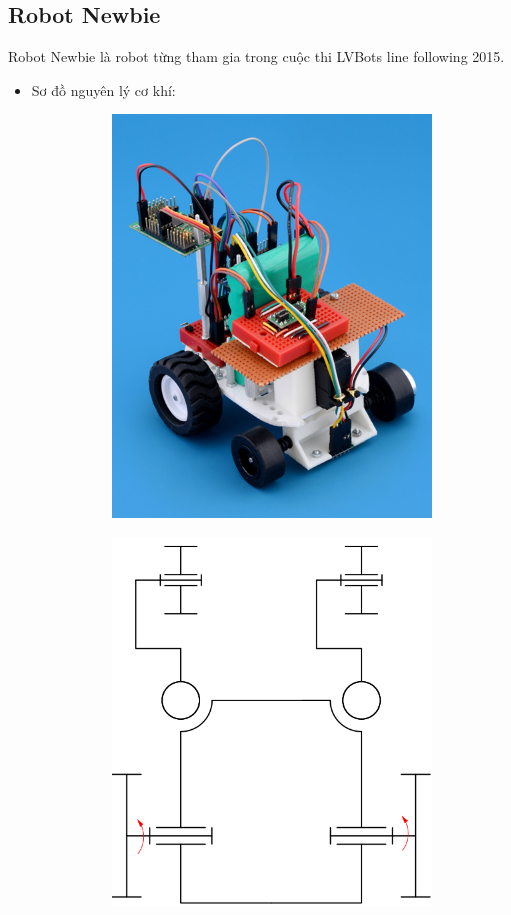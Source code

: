     \subsection{Robot Newbie}
    \hspace*{0.6cm} Robot Newbie là robot từng tham gia trong cuộc thi LVBots line following 2015.
    \begin{itemize}
        \item Sơ đồ nguyên lý cơ khí:
        \begin{figure}[H]
            \begin{subfigure}{0.5\textwidth}
            \centering
            \includegraphics[width=0.6\linewidth, right]{pictures/chapter1/chapter1_pic12a_newbie.png} 
            \label{chap1_pic12a}
            \end{subfigure}
            \begin{subfigure}{0.7\textwidth}
            \includegraphics[width=0.55\linewidth]{pictures/chapter1/chapter1_pic12b_newbie.png}

\end{subfigure}
\end{figure}
\end{itemize}
